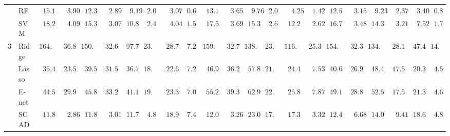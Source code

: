 \begin{tabular}{p{0.2cm}p{1cm}|p{0.6cm}p{0.6cm}|p{0.6cm}p{0.6cm}p{0.6cm}p{0.6cm}p{0.6cm}p{0.6cm}|p{0.6cm}p{0.6cm}p{0.6cm}p{0.6cm}p{0.6cm}p{0.6cm}|p{0.6cm}p{0.6cm}p{0.6cm}p{0.6cm}p{0.6cm}p{0.6cm}}
 & RF  & $\phantom{0}15.12$ & $\phantom{00}3.90$ & $\phantom{0}12.37$ & $\phantom{00}2.89$ & $\phantom{00}9.19$ & $\phantom{0}2.08$ & $\phantom{00}3.07$ & $\phantom{0}0.69$ & $\phantom{0}13.18$ & $\phantom{00}3.65$ & $\phantom{00}9.76$ & $\phantom{0}2.01$ & $\phantom{00}4.25$ & $\phantom{00}1.42$ & $\phantom{0}12.53$ & $\phantom{00}3.15$ & $\phantom{00}9.23$ & $\phantom{00}2.37$ & $\phantom{00}3.40$ & $\phantom{0}0.86$ \\
 & SVM  & $\phantom{0}18.21$ & $\phantom{00}4.09$ & $\phantom{0}15.34$ & $\phantom{00}3.07$ & $\phantom{0}10.81$ & $\phantom{0}2.45$ & $\phantom{00}4.04$ & $\phantom{0}1.54$ & $\phantom{0}17.59$ & $\phantom{00}3.69$ & $\phantom{0}15.31$ & $\phantom{0}2.66$ & $\phantom{0}12.28$ & $\phantom{00}2.62$ & $\phantom{0}16.72$ & $\phantom{00}3.48$ & $\phantom{0}14.30$ & $\phantom{00}3.21$ & $\phantom{00}7.52$ & $\phantom{0}1.74$ \\\hline
3 & Ridge  & $164.35$ & $\phantom{0}36.81$ & $150.51$ & $\phantom{0}32.67$ & $\phantom{0}97.78$ & $23.37$ & $\phantom{0}28.75$ & $\phantom{0}7.20$ & $159.29$ & $\phantom{0}32.76$ & $138.96$ & $23.87$ & $116.54$ & $\phantom{0}25.33$ & $154.77$ & $\phantom{0}32.38$ & $134.34$ & $\phantom{0}28.18$ & $\phantom{0}47.45$ & $14.78$ \\
 & Lasso  & $\phantom{0}35.41$ & $\phantom{0}23.54$ & $\phantom{0}39.56$ & $\phantom{0}31.53$ & $\phantom{0}36.76$ & $18.69$ & $\phantom{0}22.65$ & $\phantom{0}7.29$ & $\phantom{0}46.96$ & $\phantom{0}36.21$ & $\phantom{0}57.89$ & $21.14$ & $\phantom{0}24.45$ & $\phantom{00}7.53$ & $\phantom{0}40.63$ & $\phantom{0}26.95$ & $\phantom{0}48.49$ & $\phantom{0}17.55$ & $\phantom{0}20.31$ & $\phantom{0}4.58$ \\
 & E-net  & $\phantom{0}44.50$ & $\phantom{0}29.99$ & $\phantom{0}45.86$ & $\phantom{0}33.20$ & $\phantom{0}41.16$ & $19.31$ & $\phantom{0}23.33$ & $\phantom{0}7.02$ & $\phantom{0}55.23$ & $\phantom{0}39.39$ & $\phantom{0}62.92$ & $22.16$ & $\phantom{0}25.84$ & $\phantom{00}7.87$ & $\phantom{0}49.11$ & $\phantom{0}28.88$ & $\phantom{0}52.55$ & $\phantom{0}17.53$ & $\phantom{0}21.39$ & $\phantom{0}4.62$ \\
 & SCAD  & $\phantom{0}11.87$ & $\phantom{00}2.86$ & $\phantom{0}11.83$ & $\phantom{00}3.01$ & $\phantom{0}11.76$ & $\phantom{0}4.85$ & $\phantom{0}18.98$ & $\phantom{0}7.47$ & $\phantom{0}12.02$ & $\phantom{00}3.26$ & $\phantom{0}23.02$ & $17.75$ & $\phantom{0}17.31$ & $\phantom{00}3.32$ & $\phantom{0}12.46$ & $\phantom{00}6.68$ & $\phantom{0}14.02$ & $\phantom{00}9.41$ & $\phantom{0}18.62$ & $\phantom{0}4.86$ \\

\end{tabular}
